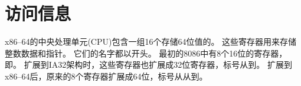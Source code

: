 
\section{访问信息}
{
    x86--64的中央处理单元(CPU)包含一组16个存储64位值的。
    这些寄存器用来存储整数数据和指针。
    它们的名字都以开头。
    最初的8086中有8个16位的寄存器，即。
    扩展到IA32架构时，这些寄存器也扩展成32位寄存器，标号从到。
    扩展到x86--64后，原来的8个寄存器扩展成64位，标号从从到。
}
